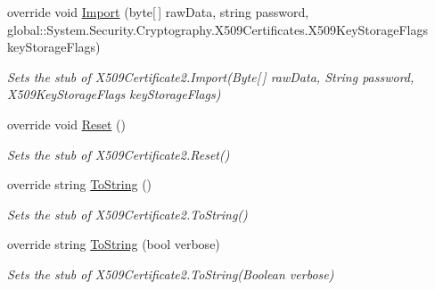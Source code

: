 \begin{DoxyCompactItemize}
override void \hyperlink{class_system_1_1_security_1_1_cryptography_1_1_x509_certificates_1_1_fakes_1_1_stub_x509_certificate2_a35e4ac2e38b28b492fd7206b2af6d87e}{Import} (byte\mbox{[}$\,$\mbox{]} raw\-Data, string password, global\-::\-System.\-Security.\-Cryptography.\-X509\-Certificates.\-X509\-Key\-Storage\-Flags key\-Storage\-Flags)
\begin{DoxyCompactList}\small\item\em Sets the stub of X509\-Certificate2.\-Import(\-Byte\mbox{[}$\,$\mbox{]} raw\-Data, String password, X509\-Key\-Storage\-Flags key\-Storage\-Flags)\end{DoxyCompactList}\item 
override void \hyperlink{class_system_1_1_security_1_1_cryptography_1_1_x509_certificates_1_1_fakes_1_1_stub_x509_certificate2_a19bf0b76751457ce1bb4945e5e679f0d}{Reset} ()
\begin{DoxyCompactList}\small\item\em Sets the stub of X509\-Certificate2.\-Reset()\end{DoxyCompactList}\item 
override string \hyperlink{class_system_1_1_security_1_1_cryptography_1_1_x509_certificates_1_1_fakes_1_1_stub_x509_certificate2_a3b3f3742926ca7e9e307c83901ef8950}{To\-String} ()
\begin{DoxyCompactList}\small\item\em Sets the stub of X509\-Certificate2.\-To\-String()\end{DoxyCompactList}\item 
override string \hyperlink{class_system_1_1_security_1_1_cryptography_1_1_x509_certificates_1_1_fakes_1_1_stub_x509_certificate2_afc4d8021aaaa159b03b59b8276005fe6}{To\-String} (bool verbose)
\begin{DoxyCompactList}\small\item\em Sets the stub of X509\-Certificate2.\-To\-String(\-Boolean verbose)\end{DoxyCompactList}\end{DoxyCompactItemize}
